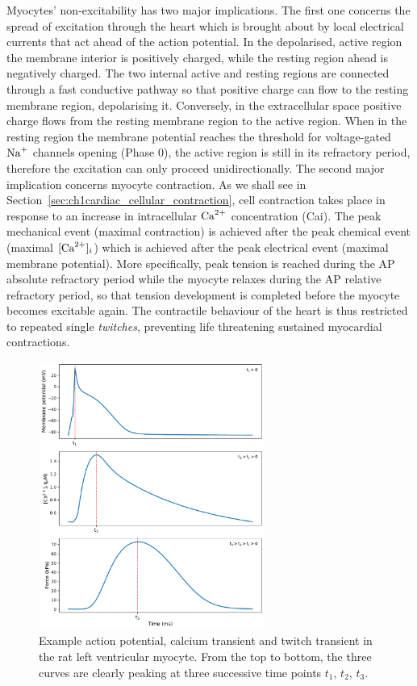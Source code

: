 \vspace{0.2cm}\noindent
Myocytes' non-excitability has two major implications. The first one concerns the spread of excitation through the heart which is brought about by local electrical currents that act ahead of the action potential. In the depolarised, active region the membrane interior is positively charged, while the resting region ahead is negatively charged. The two internal active and resting regions are connected through a fast conductive pathway so that positive charge can flow to the resting membrane region, depolarising it. Conversely, in the extracellular space positive charge flows from the resting membrane region to the active region. When in the resting region the membrane potential reaches the threshold for voltage-gated $\textrm{Na}^{+}$ channels opening (Phase $0$), the active region is still in its refractory period, therefore the excitation can only proceed unidirectionally. The second major implication concerns myocyte contraction. As we shall see in Section~\ref{sec:ch1cardiac_cellular_contraction}, cell contraction takes place in response to an increase in intracellular $\textrm{Ca}^{2+}$ concentration (\acs{Cai}). The peak mechanical event (maximal contraction) is achieved after the peak chemical event (maximal $[\textrm{Ca}^{2+}]_{i}$) which is achieved after the peak electrical event (maximal membrane potential). More specifically, peak tension is reached during the AP absolute refractory period while the myocyte relaxes during the AP relative refractory period, so that tension development is completed before the myocyte becomes excitable again. The contractile behaviour of the heart is thus restricted to repeated single \textit{twitches}, preventing life threatening sustained myocardial contractions.

\begin{figure}[!ht]
    \myfloatalign
    \includegraphics[width=0.66\textwidth]{figures/chapter01/three_peaks.pdf}
    \caption{Example action potential, calcium transient and twitch transient in the rat left ventricular myocyte. From the top to bottom, the three curves are clearly peaking at three successive time points $t_1,\,t_2,\,t_3$.}
    \label{fig:my_label1}
\end{figure}

